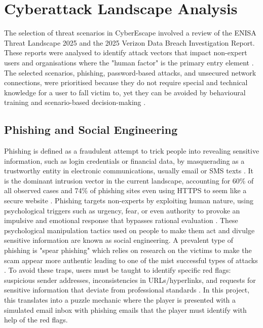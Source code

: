\documentclass[sigconf, authorversion=true, nonacm=true]{acmart}%
\begin{document}
\section{Cyberattack Landscape Analysis}

The selection of threat scenarios in CyberEscape involved a review of the ENISA Threat Landscape 2025 and the 2025 Verizon Data Breach Investigation Report. These reports were analysed to identify attack vectors that impact non-expert users and organisations where the "human factor" is the primary entry element \cite{verizon_dbir_2025, noauthor_threat_2025}. The selected scenarios, phishing, password-based attacks, and unsecured network connections, were prioritised because they do not require special and technical knowledge for a user to fall victim to, yet they can be avoided by behavioural training and scenario-based decision-making \cite{keller_digital_2025, sans_security_awareness_2025}.


\subsection{Phishing and Social Engineering }

Phishing is defined as a fraudulent attempt to trick people into revealing sensitive information, such as login credentials or financial data, by masquerading as a trustworthy entity in electronic communications, usually email or SMS texts \cite{enisa_phishing_2020}. It is the dominant intrusion vector in the current landscape, accounting for 60\% of all observed cases and 74\% of phishing sites even using HTTPS to seem like a secure website \cite{noauthor_threat_2025, enisa_phishing_2020}. 
Phishing targets non-experts by exploiting human nature, using psychological triggers such as urgency, fear, or even authority to provoke an impulsive and emotional response that bypasses rational evaluation \cite{enisa_phishing_2020, keller_digital_2025}. These psychological manipulation tactics used on people to make them act and divulge sensitive information are known as social engineering.
A prevalent type of phishing is "spear phishing" which relies on research on the victims to make the scam appear more authentic leading to one of the mist successful types of attacks \cite{enisa_phishing_2020}.
To avoid these traps, users must be taught to identify specific red flags: suspicious sender addresses, inconsistencies in URLs/hyperlinks, and requests for sensitive information that deviate from professional standards \cite{enisa_phishing_2020}. In this project, this translates into a puzzle mechanic where the player is presented with a simulated email inbox with phishing emails that the player must identify with help of the red flags.
\end{document}

